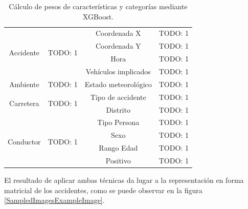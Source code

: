 \begin{enumerate}
\begin{table}[H]
\begin{tabular}{ |c|c|c|c| }
                   \hline
                   \multirow{4}{*}{Accidente}   & \multirow{4}{*}{TODO: 1}      & Coordenada X          & TODO: 1\\
                                                &                               & Coordenada Y          & TODO: 1\\
                                                &                               & Hora                  & TODO: 1\\
                                                &                               & Vehículos implicados  & TODO: 1\\

                   \hline
                   \multirow{1}{*}{Ambiente}    & \multirow{1}{*}{TODO: 1}      & Estado meteorológico  & TODO: 1\\

                   \hline
                   \multirow{2}{*}{Carretera}   & \multirow{2}{*}{TODO: 1}      & Tipo de accidente     & TODO: 1\\
                                                &                               & Distrito              & TODO: 1\\

                   \hline
                   \multirow{4}{*}{Conductor}   & \multirow{4}{*}{TODO: 1}      & Tipo Persona          & TODO: 1\\
                                                &                               & Sexo                  & TODO: 1\\
                                                &                               & Rango Edad            & TODO: 1\\
                                                &                               & Positivo              & TODO: 1\\
                   \hline
              \end{tabular}
              \caption{Cálculo de pesos de características y categorías mediante XGBoost.}
              \label{PesosFinalesCaracteristicas}
            \end{table}


            El resultado de aplicar ambas técnicas da lugar a la representación en forma matricial de los accidentes, como se puede observar en la figura \ref{SampledImagesExampleImage}.

            \begin{figure}[H]
                \centering
                
                
                


\end{figure}
\end{enumerate}
